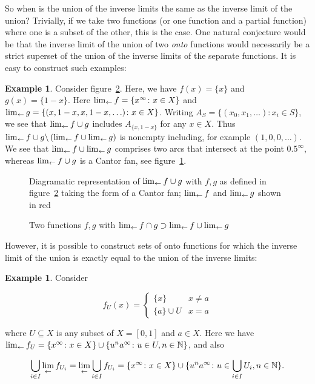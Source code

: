 \documentclass{article}
\theoremstyle{definition}
\newtheorem{exam}[thm]{Example}
\begin{document}
So when is the union of the inverse limits the same as the inverse
limit of the union?  Trivially, if we take two functions (or one
function and a partial function) where one is a subset of the other,
this is the case.  One natural conjecture would be that the inverse
limit of the union of two {\em onto} functions would necessarily be a
strict superset of the union of the inverse limits of the separate
functions.  It is easy to construct such examples:

\begin{exam}
Consider figure~\ref{strictsuperset}.  Here, we have $f(x)=\lbrace
x\rbrace$ and $g(x)=\lbrace 1-x\rbrace$.  Here $\lim_{\leftarrow} f=\lbrace
x^\infty\colon x\in X\rbrace$ and $\lim_{\leftarrow} g = \lbrace (x, 1-x, x,
1-x, \ldots)\colon x\in X\rbrace$.  Writing
$A_S=\lbrace(x_0,x_1,\ldots)\colon x_i\in S\rbrace$, we see that
$\lim_{\leftarrow} f\cup g$ includes $A_{\lbrace x,1-x\rbrace}$ for any $x\in
X$. Thus $\lim_{\leftarrow} f\cup
  g\backslash\left(\lim_{\leftarrow} f\cup\lim_{\leftarrow} g\right)$ is nonempty
including, for example $(1,0,0,\ldots)$.  We see that
$\lim_{\leftarrow} f\cup\lim_{\leftarrow} g$ comprises two arcs that intersect at the
point $0.5^\infty$, whereas $\lim_{\leftarrow} f \cup g$ is a Cantor fan, see
figure~\ref{cantorfan}.
\end{exam}

\begin{figure}[h]
\caption{Diagramatic representation of\label{cantorfan} $\lim_{\leftarrow} f\cup
    g$ with $f,g$ as defined in figure~\ref{strictsuperset} taking the
  form of a Cantor fan; $\lim_{\leftarrow} f$ and $\lim_{\leftarrow} g$ shown in red}
\end{figure}

\begin{figure}[h]
\caption{Two \label{strictsuperset} functions $f,g$ with $\lim_{\leftarrow} f\cap g\supset\lim_{\leftarrow} f\cup\lim_{\leftarrow} g$}
\end{figure}

However, it is possible to construct sets of onto functions for which
the inverse limit of the union is exactly equal to the union of the
inverse limits:

\begin{exam}
Consider

\begin{equation}
  f_U(x) = \begin{cases}
    \lbrace x\rbrace & x\neq a\\
    \lbrace a\rbrace\cup U & x=a
  \end{cases}
\end{equation}

where $U\subseteq X$ is any subset of $X=[0,1]$ and $a\in X$.  Here we
have $\lim_{\leftarrow} f_U=\lbrace x^\infty\colon x\in X\rbrace\cup\lbrace
u^na^\infty\colon u\in U, n\in\mathbb{N}\rbrace$, and also

\begin{equation}
  \bigcup_{i\in I}\lim_{\leftarrow} f_{U_i}=
  \lim_{\leftarrow} \bigcup_{i\in I}f_{U_i}=
  \lbrace x^\infty\colon x\in X\rbrace\cup\lbrace
  u^na^\infty\colon u\in\bigcup_{i\in I}U_i, n\in\mathbb{N}\rbrace.
\end{equation}
\end{exam}
\end{document}

